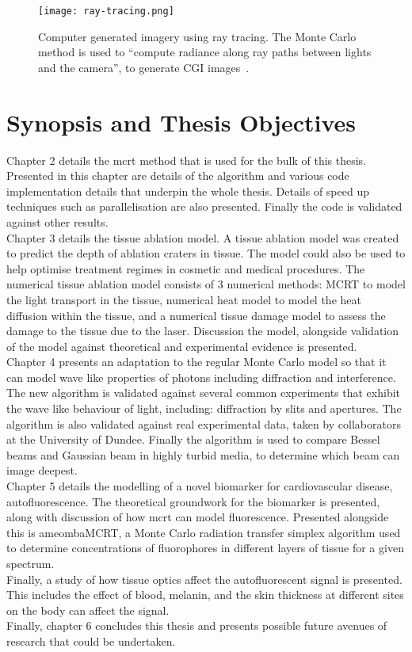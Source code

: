 \begin{figure}[!htbp]
\centering
\texttt{[image: ray-tracing.png]}
\caption{Computer generated imagery using ray tracing. The Monte Carlo method is used to ``compute radiance along ray paths between lights and the camera'', to generate CGI images~\cite{pharr2016physically}.}
\label{fig:ray-trace}
\end{figure}


\section{Synopsis and Thesis Objectives}

Chapter 2 details the \gls*{mcrt} method that is used for the bulk of this thesis.
Presented in this chapter are details of the algorithm and various code implementation details that underpin the whole thesis.
Details of speed up techniques such as parallelisation are also presented.
Finally the code is validated against other results.\\


Chapter 3 details the tissue ablation model.
A tissue ablation model was created to predict the depth of ablation craters in tissue.
The model could also be used to help optimise treatment regimes in cosmetic and medical procedures.
The numerical tissue ablation model consists of 3 numerical methods: MCRT to model the light transport in the tissue, numerical heat model to model the heat diffusion within the tissue, and a numerical tissue damage model to assess the damage to the tissue due to the laser.
Discussion the model, alongside validation of the model against theoretical and experimental evidence is presented.\\


Chapter 4 presents an adaptation to the regular Monte Carlo model so that it can model wave like properties of photons including diffraction and interference.
The new algorithm is validated against several common experiments that exhibit the wave like behaviour of light, including: diffraction by slits and apertures.
The algorithm is also validated against real experimental data, taken by collaborators at the University of Dundee.
Finally the algorithm is used to compare Bessel beams and Gaussian beam in highly turbid media, to determine which beam can image deepest.\\


Chapter 5 details the modelling of a novel biomarker for cardiovascular disease, autofluorescence.
The theoretical groundwork for the biomarker is presented, along with discussion of how \gls*{mcrt} can model fluorescence.
Presented alongside this is ameombaMCRT, a Monte Carlo radiation transfer simplex algorithm used to determine concentrations of fluorophores in different layers of tissue for a given spectrum.\\
Finally, a study of how tissue optics affect the autofluorescent signal is presented.
This includes the effect of blood, melanin, and the skin thickness at different sites  on the body can affect the signal.\\


Finally, chapter 6 concludes this thesis and presents possible future avenues of research that could be undertaken.
